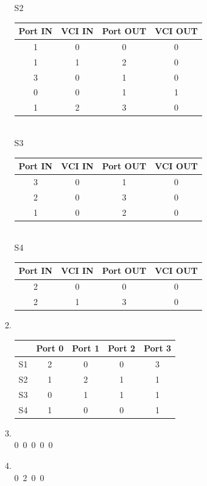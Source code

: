 \documentclass[10pt, a4paper]{article}
\begin{document}
\begin{enumerate}
\begin{enumerate}
        S2\\
        \begin{tabular}{cccc}
            \toprule
            Port IN & VCI IN & Port OUT & VCI OUT\\
            \hline
            1 & 0 & 0 & 0\\
            1 & 1 & 2 & 0\\
            3 & 0 & 1 & 0\\
            0 & 0 & 1 & 1\\
            1 & 2 & 3 & 0\\
            \bottomrule
        \end{tabular}\\

        S3\\
        \begin{tabular}{cccc}
            \toprule
            Port IN & VCI IN & Port OUT & VCI OUT\\
            \hline
            3 & 0 & 1 & 0\\
            2 & 0 & 3 & 0\\
            1 & 0 & 2 & 0\\
            \bottomrule
        \end{tabular}\\

        S4\\
        \begin{tabular}{cccc}
            \toprule
            Port IN & VCI IN & Port OUT & VCI OUT\\
            \hline
            2 & 0 & 0 & 0\\
            2 & 1 & 3 & 0\\
            \bottomrule
        \end{tabular}
    \item\mbox{}\\
        \begin{tabular}{l|cccc}
            & Port 0 & Port 1 & Port 2 & Port 3\\
            \hline
            S1 & 2 & 0 & 0 & 3\\
            S2 & 1 & 2 & 1 & 1\\
            S3 & 0 & 1 & 1 & 1\\
            S4 & 1 & 0 & 0 & 1
        \end{tabular}
    \item\mbox{}\\
        0\ 0\ 0\ 0\ 0
    \item\mbox{}\\
        0\ 2\ 0\ 0
    \end{enumerate}


\end{enumerate}
\end{document}

